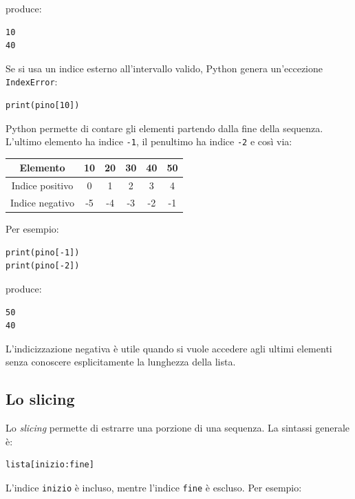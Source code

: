 \documentclass[11pt,a4paper]{book}
\begin{document}
produce:

\begin{lstlisting}[style=python, numbers=none]
10
40
\end{lstlisting}

Se si usa un indice esterno all'intervallo valido, Python genera un'eccezione \texttt{IndexError}:

\begin{lstlisting}[style=python]
print(pino[10])
\end{lstlisting}


Python permette di contare gli elementi partendo dalla fine della sequenza. L'ultimo elemento ha indice \texttt{-1}, il penultimo ha indice \texttt{-2} e così via:

\begin{center}
\begin{tabular}{c|ccccc}
\toprule
Elemento & 10 & 20 & 30 & 40 & 50 \\
\midrule
Indice positivo & 0 & 1 & 2 & 3 & 4 \\
Indice negativo & -5 & -4 & -3 & -2 & -1 \\
\bottomrule
\end{tabular}
\end{center}

Per esempio:

\begin{lstlisting}[style=python]
print(pino[-1])
print(pino[-2])
\end{lstlisting}

produce:

\begin{lstlisting}[style=python, numbers=none]
50
40
\end{lstlisting}

L'indicizzazione negativa è utile quando si vuole accedere agli ultimi elementi senza conoscere esplicitamente la lunghezza della lista.

\subsection{Lo slicing}

Lo \emph{slicing} permette di estrarre una porzione di una sequenza. La sintassi generale è:

\begin{lstlisting}[style=python, numbers=none]
lista[inizio:fine]
\end{lstlisting}

L'indice \texttt{inizio} è incluso, mentre l'indice \texttt{fine} è escluso. Per esempio:
\end{document}
